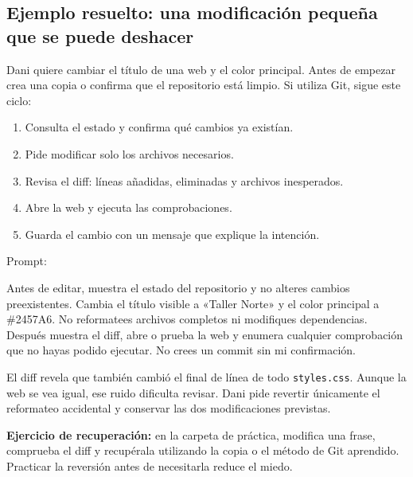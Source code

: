 \documentclass[10pt,a4paper,openany]{book}
\providecommand{\tightlist}{\setlength{\itemsep}{0.18em}\setlength{\parskip}{0pt}}
\newenvironment{Shaded}{}{}
\newcommand{\NormalTok}[1]{#1}
\renewenvironment{Shaded}
  {\begin{tcolorbox}[
    enhanced,
    breakable,
    colback=CodeBg,
    colframe=Border,
    boxrule=0.5pt,
    arc=2mm,
    left=3mm,
    right=3mm,
    top=2.2mm,
    bottom=2.2mm,
    before skip=0.8em,
    after skip=0.9em
  ]}
  {\end{tcolorbox}}
\begin{document}
\subsection{Ejemplo resuelto: una modificación pequeña que se puede
deshacer}\label{ejemplo-resuelto-una-modificaciuxf3n-pequeuxf1a-que-se-puede-deshacer}

Dani quiere cambiar el título de una web y el color principal. Antes de
empezar crea una copia o confirma que el repositorio está limpio. Si
utiliza Git, sigue este ciclo:

\begin{enumerate}
\def\labelenumi{\arabic{enumi}.}
\tightlist
\item
  Consulta el estado y confirma qué cambios ya existían.
\item
  Pide modificar solo los archivos necesarios.
\item
  Revisa el diff: líneas añadidas, eliminadas y archivos inesperados.
\item
  Abre la web y ejecuta las comprobaciones.
\item
  Guarda el cambio con un mensaje que explique la intención.
\end{enumerate}

Prompt:

\begin{Shaded}
\begin{Highlighting}[]
\NormalTok{Antes de editar, muestra el estado del repositorio y no alteres cambios}
\NormalTok{preexistentes. Cambia el título visible a «Taller Norte» y el color principal}
\NormalTok{a \#2457A6. No reformatees archivos completos ni modifiques dependencias.}
\NormalTok{Después muestra el diff, abre o prueba la web y enumera cualquier comprobación}
\NormalTok{que no hayas podido ejecutar. No crees un commit sin mi confirmación.}
\end{Highlighting}
\end{Shaded}

El diff revela que también cambió el final de línea de todo
\texttt{styles.css}. Aunque la web se vea igual, ese ruido dificulta
revisar. Dani pide revertir únicamente el reformateo accidental y
conservar las dos modificaciones previstas.

\begin{practicebox}

\textbf{Ejercicio de recuperación:} en la carpeta de práctica, modifica
una frase, comprueba el diff y recupérala utilizando la copia o el
método de Git aprendido. Practicar la reversión antes de necesitarla
reduce el miedo.

\end{practicebox}
\end{document}
